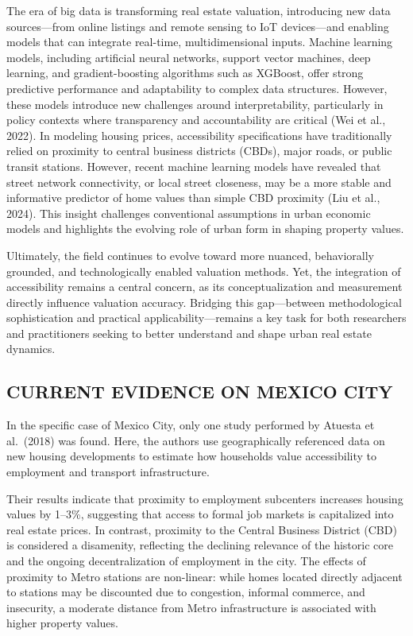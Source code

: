 \documentclass[
  12pt,
]{report}
\begin{document}
The era of big data is transforming real estate valuation, introducing
new data sources---from online listings and remote sensing to IoT
devices---and enabling models that can integrate real-time,
multidimensional inputs. Machine learning models, including artificial
neural networks, support vector machines, deep learning, and
gradient-boosting algorithms such as XGBoost, offer strong predictive
performance and adaptability to complex data structures. However, these
models introduce new challenges around interpretability, particularly in
policy contexts where transparency and accountability are critical (Wei
et al., 2022). In modeling housing prices, accessibility specifications
have traditionally relied on proximity to central business districts
(CBDs), major roads, or public transit stations. However, recent machine
learning models have revealed that street network connectivity, or local
street closeness, may be a more stable and informative predictor of home
values than simple CBD proximity (Liu et al., 2024). This insight
challenges conventional assumptions in urban economic models and
highlights the evolving role of urban form in shaping property values.

Ultimately, the field continues to evolve toward more nuanced,
behaviorally grounded, and technologically enabled valuation methods.
Yet, the integration of accessibility remains a central concern, as its
conceptualization and measurement directly influence valuation accuracy.
Bridging this gap---between methodological sophistication and practical
applicability---remains a key task for both researchers and
practitioners seeking to better understand and shape urban real estate
dynamics.

\subsection{CURRENT EVIDENCE ON MEXICO
CITY}\label{current-evidence-on-mexico-city}

In the specific case of Mexico City, only one study performed by Atuesta
et al.~(2018) was found. Here, the authors use geographically referenced
data on new housing developments to estimate how households value
accessibility to employment and transport infrastructure.

Their results indicate that proximity to employment subcenters increases
housing values by 1--3\%, suggesting that access to formal job markets
is capitalized into real estate prices. In contrast, proximity to the
Central Business District (CBD) is considered a disamenity, reflecting
the declining relevance of the historic core and the ongoing
decentralization of employment in the city. The effects of proximity to
Metro stations are non-linear: while homes located directly adjacent to
stations may be discounted due to congestion, informal commerce, and
insecurity, a moderate distance from Metro infrastructure is associated
with higher property values.
\end{document}
